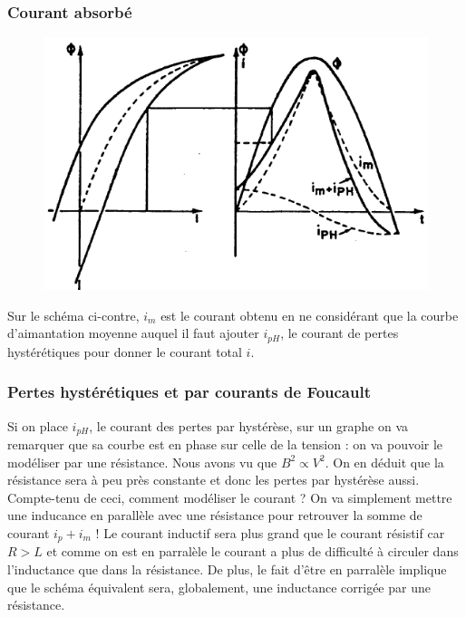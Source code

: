 		\subsubsection{Courant absorbé}
		\begin{figure}
		\includegraphics[scale=0.3]{ch3/image5.png}
		\end{figure}
		Sur le schéma ci-contre, $i_m$ 
		est le courant obtenu en ne considérant que la courbe d'aimantation 
		moyenne auquel il faut ajouter $i_{pH}$, le courant de pertes 
		hystérétiques pour donner le courant total $i$.
		
		
		\subsubsection{Pertes hystérétiques et par courants de Foucault}
		Si on place $i_{pH}$, le courant des pertes par hystérèse, sur un graphe
		 on va remarquer que sa courbe est en phase sur celle de la tension : 
		 on va pouvoir le modéliser par une résistance. Nous avons vu que 
		 $B^2\propto V^2$. On en déduit que la résistance sera à peu près 
		 constante et donc les pertes par hystérèse aussi.		\\
		 
		Compte-tenu de ceci, comment modéliser le courant ? On va simplement 
		mettre une inducance en parallèle avec une résistance pour retrouver 
		la somme de courant $i_p+i_m$ ! Le courant inductif sera plus grand 
		que le courant résistif car $R > L$ et comme on est en parralèle le 
		courant a plus de difficulté à circuler dans l'inductance que dans 
		la résistance. De plus, le fait d'être en parralèle implique que 
		le schéma équivalent sera, globalement, une inductance corrigée 
		par une résistance.
		
